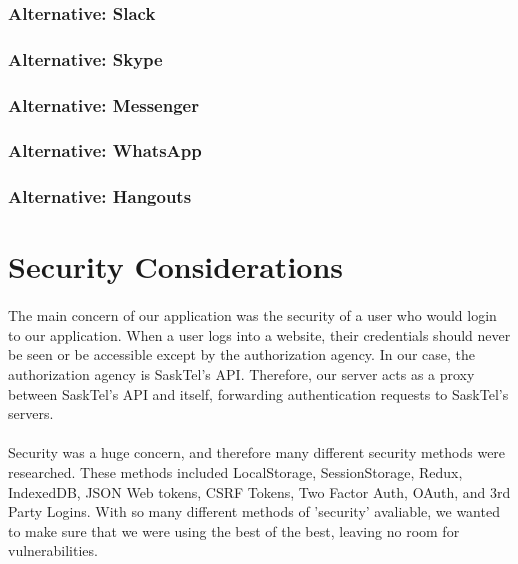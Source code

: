 \documentclass[12pt]{article}
\begin{document}
\subsubsection{Alternative: Slack}

\subsubsection{Alternative: Skype}

\subsubsection{Alternative: Messenger}

\subsubsection{Alternative: WhatsApp}

\subsubsection{Alternative: Hangouts}

\newpage
\section{Security Considerations}
\paragraph{}
	The main concern of our application was the security of a user who would login to our application. When a user logs into a website, their credentials should never be seen or be accessible except by the authorization agency. In our case, the authorization agency is SaskTel's API. Therefore, our server acts as a proxy between SaskTel's API and itself, forwarding authentication requests to SaskTel's servers.
\paragraph{}	
	Security was a huge concern, and therefore many different security methods were researched. These methods included LocalStorage, SessionStorage, Redux, IndexedDB, JSON Web tokens, CSRF Tokens, Two Factor Auth, OAuth, and 3rd Party Logins. With so many different methods of 'security' avaliable, we wanted to make sure that we were using the best of the best, leaving no room for vulnerabilities.
\end{document}
